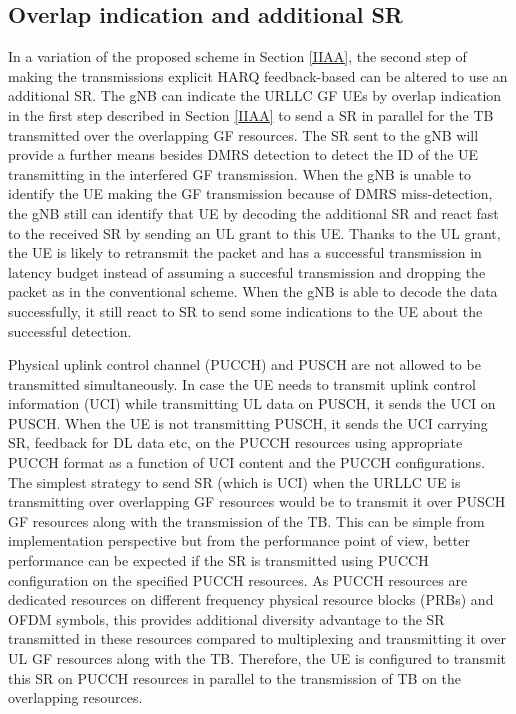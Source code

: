 \documentclass[conference]{IEEEtran}
\begin{document}
\subsection{Overlap indication and additional SR}\label{IIBB}
In a variation of the proposed scheme in Section \ref{IIAA}, the second step of making the transmissions explicit HARQ feedback-based can be altered to use an additional SR. The gNB can indicate the URLLC GF UEs by overlap indication in the first step described in Section \ref{IIAA} to send a SR in parallel for the TB transmitted over the overlapping GF resources. The SR sent to the gNB will provide a further means besides DMRS detection to detect the ID of the UE transmitting in the interfered GF transmission. When the gNB is unable to identify the UE making the GF transmission because of DMRS miss-detection, the gNB still can identify that UE by decoding the additional SR and react fast to the received SR by sending an UL grant to this UE. Thanks to the UL grant, the UE is likely to retransmit the packet and has a successful transmission in latency budget instead of assuming a succesful transmission and dropping the packet as in the conventional scheme. When the gNB is able to decode the data successfully, it still react to SR to send some indications to the UE about the successful detection.  

Physical uplink control channel (PUCCH) and PUSCH are not allowed to be transmitted simultaneously. In case the UE needs to transmit uplink control information (UCI) while transmitting UL data on PUSCH, it sends the UCI on PUSCH. When the UE is not transmitting PUSCH, it sends the UCI carrying SR, feedback for DL data  etc, on the PUCCH resources using appropriate PUCCH format as a function of UCI content and the PUCCH configurations. The simplest strategy to send SR (which is UCI) when the URLLC UE is transmitting over overlapping GF resources would be to transmit it over PUSCH GF resources along with the transmission of the TB. This can be simple from implementation perspective but from the performance point of view, better performance can be expected if the SR is transmitted using PUCCH configuration on the specified PUCCH resources. As PUCCH resources are dedicated resources on different frequency physical resource blocks (PRBs) and OFDM symbols, this provides additional diversity advantage to the SR transmitted in these resources compared to multiplexing and transmitting it over UL GF resources along with the TB. Therefore, the UE is configured to transmit this SR on PUCCH resources in parallel to the transmission of TB on the overlapping resources.
\end{document}
